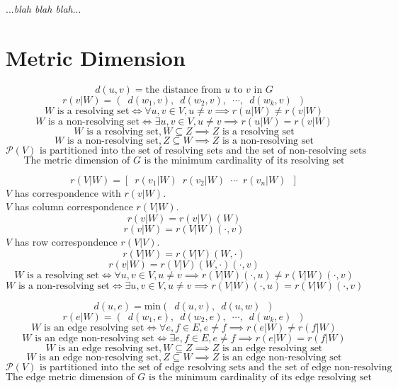 \documentclass{article}
\begin{document}
	...\textit{blah blah blah}...

	\clearpage
	\section{Metric Dimension}

	\[ d(u, v) = \text{the distance from } u \text{ to } v \text{ in } G \]
	\[ r(v|W) = (\enspace d(w_1, v),\enspace d(w_2, v),\enspace \cdots,\enspace d(w_k, v)\enspace ) \]
	\[ W \text{ is a resolving set} \iff \forall u, v \in V, u \neq v \implies r(u|W) \neq r(v|W) \]
	\[ W \text{ is a non-resolving set} \iff \exists u, v \in V, u \neq v \implies r(u|W) = r(v|W) \]
	\[ W \text{ is a resolving set}, W \subseteq Z \implies Z \text{ is a resolving set} \]
	\[ W \text{ is a non-resolving set}, Z \subseteq W \implies Z \text{ is a non-resolving set} \]
	\[ \mathcal{P}(V) \text{ is partitioned into the set of resolving sets and the set of non-resolving sets} \]
	\[ \text{The metric dimension of } G \text{ is the minimum cardinality of its resolving set} \]

	\[ r(V|W) = \left[\enspace r(v_1|W)\enspace r(v_2|W)\enspace \cdots\enspace r(v_n|W)\enspace \right] \]
	\(V\) has correspondence with \(r(v|W)\). \\
	\(V\) has column correspondence \(r(V|W)\).
	\[ r(v|W) = r(v|V)(W) \]
	\[ r(v|W) = r(V|W)(\cdot, v) \]
	\(V\) has row correspondence \(r(V|V)\).
	\[ r(V|W) = r(V|V)(W, \cdot) \]
	\[ r(v|W) = r(V|V)(W, \cdot)(\cdot, v) \]
	\[ W \text{ is a resolving set} \iff \forall u, v \in V, u \neq v \implies r(V|W)(\cdot, u) \neq r(V|W)(\cdot, v) \]
	\[ W \text{ is a non-resolving set} \iff \exists u, v \in V, u \neq v \implies r(V|W)(\cdot, u) = r(V|W)(\cdot, v) \]

	\[ d(u, e) = \textrm{min}(\enspace d(u, v),\enspace d(u, w)\enspace ) \]
	\[ r(e|W) = (\enspace d(w_1, e),\enspace d(w_2, e),\enspace \cdots,\enspace d(w_k, e)\enspace ) \]
	\[ W \text{ is an edge resolving set} \iff \forall e, f \in E, e \neq f \implies r(e|W) \neq r(f|W) \]
	\[ W \text{ is an edge non-resolving set} \iff \exists e, f \in E, e \neq f \implies r(e|W) = r(f|W) \]
	\[ W \text{ is an edge resolving set}, W \subseteq Z \implies Z \text{ is an edge resolving set} \]
	\[ W \text{ is an edge non-resolving set}, Z \subseteq W \implies Z \text{ is an edge non-resolving set} \]
	\[ \mathcal{P}(V) \text{ is partitioned into the set of edge resolving sets and the set of edge non-resolving sets} \]
	\[ \text{The edge metric dimension of } G \text{ is the minimum cardinality of its edge resolving set} \]
\end{document}
